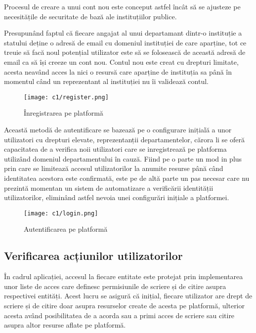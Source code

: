 Procesul de creare a unui cont nou este conceput astfel încât să se ajusteze pe necesitățile de securitate de bază ale instituțiilor publice.
\par  Presupunând faptul că fiecare angajat al unui departamant dintr-o instituție a statului deține o adresă de email cu domeniul instituției de care aparține, tot ce treuie să facă noul potențial utilizator este să se folosească de această adresă de email ca să își creeze un cont nou. Contul nou este creat cu drepturi limitate, acesta neavând acces la nici o resursă care aparține de instituția sa până în momentul când un reprezentant al instituției nu îi validează contul.
 
 	\vspace{0.5 cm}
 \begin{figure}[h]
 	\centering
 	
 	\texttt{[image: c1/register.png]}
 	\caption{Înregistrarea  pe platformă}
 \end{figure}
 
Această metodă de autentificare se bazează pe o  configurare inițială a unor utilizatori cu drepturi elevate, reprezentanții departamentelor, cărora li se oferă capacitatea de a verifica noii utilizatori care se inregistrează pe platforma utilizând domeniul departamentului în cauză. Fiind pe o parte un mod in plus prin care se limitează accesul utilizatorilor la anumite resurse până când identitatea acestora este confirmată, este pe de altă parte un pas necesar care nu prezintă momentan un sistem de automatizare a verificării identității utilizatorilor, eliminând astfel nevoia unei configurări inițiale a platformei.
	\vspace{0.5 cm}
\begin{figure}[h]
	\centering
	
	\texttt{[image: c1/login.png]}
	\caption{Autentificarea pe platformă}
\end{figure}

\subsection{Verificarea acțiunilor utilizatorilor}
În cadrul aplicației, accesul la fiecare entitate este protejat prin implementarea unor liste de acces care definesc permisiunile de scriere și de citire asupra respectivei entități. Acest lucru se asigură că inițial, fiecare utilizator are drept de scriere și de citire doar asupra resurselor create de acesta pe platformă, ulterior acesta având posibilitatea de a acorda sau a primi acces de scriere sau citire asupra altor resurse aflate pe platformă.
	

